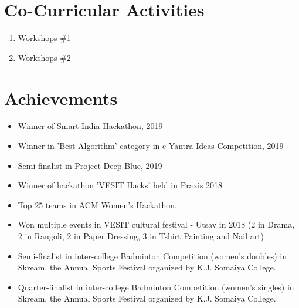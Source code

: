\documentclass[margin]{res}
\begin{document}
\begin{resume}
\section{Co-Curricular Activities}
\begin{enumerate}
\item Workshops \#1
\item Workshops \#2
\end{enumerate}

\section{Achievements}
\begin{itemize}
\item Winner of Smart India Hackathon, 2019
\item Winner in 'Best Algorithm' category in e-Yantra Ideas Competition, 2019
\item Semi-finalist in Project Deep Blue, 2019
\item Winner of hackathon 'VESIT Hacks' held in Praxis 2018
\item Top 25 teams in ACM Women's Hackathon. 
\item Won multiple events in VESIT cultural festival - Utsav in 2018 (2 in Drama, 2 in Rangoli, 2 in Paper Dressing, 3 in Tshirt Painting and Nail art)
\item Semi-finalist in inter-college Badminton Competition (women's doubles) in Skream, the Annual Sports Festival organized by K.J. Somaiya College.
\item Quarter-finalist in inter-college Badminton Competition (women's singles) in Skream, the Annual Sports Festival organized by K.J. Somaiya College.
\end{itemize}

\end{resume}
\end{document}
